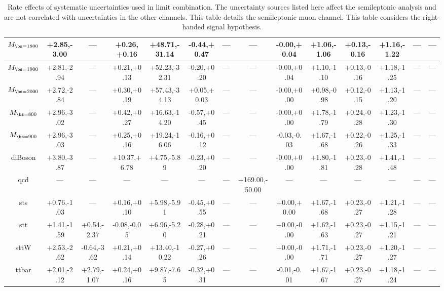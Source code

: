 \begin{table}
\begin{center}
\begin{small}
{\begin{tabular}{|c||ccccccccccccc|}
\hline 
$M_{\bs=1800}$ & +2.85,-3.00 & --- & +0.26,+0.16 & +48.71,-31.14 & -0.44,+0.47 & --- & --- & -0.00,+0.04 & +1.06,-1.06 & +0.13,-0.16 & +1.16,-1.22 & --- & --- \\ 
\hline 
$M_{\bs=1900}$ & +2.81,-2.94 & --- & +0.21,+0.13 & +52.23,-32.31 & -0.20,+0.20 & --- & --- & -0.00,+0.04 & +1.10,-1.10 & +0.13,-0.16 & +1.18,-1.25 & --- & --- \\ 
\hline 
$M_{\bs=2000}$ & +2.72,-2.84 & --- & +0.30,+0.19 & +57.43,-34.13 & +0.05,+0.03 & --- & --- & -0.00,+0.00 & +0.98,-0.98 & +0.12,-0.15 & +1.13,-1.20 & --- & --- \\ 
\hline 
$M_{\bs=800}$ & +2.96,-3.02 & --- & +0.42,+0.27 & +16.63,-14.20 & -0.57,+0.45 & --- & --- & -0.00,+0.00 & +1.78,-1.79 & +0.24,-0.28 & +1.23,-1.30 & --- & --- \\ 
\hline 
$M_{\bs=900}$ & +2.96,-3.03 & --- & +0.25,+0.16 & +19.24,-16.06 & -0.16,+0.12 & --- & --- & -0.03,-0.03 & +1.67,-1.68 & +0.22,-0.26 & +1.25,-1.33 & --- & --- \\ 
\hline 
diBoson & +3.80,-3.87 & --- & +10.37,+6.78 & +4.75,-5.89 & -0.23,+0.20 & --- & --- & -0.00,+0.00 & +1.80,-1.81 & +0.23,-0.28 & +1.41,-1.48 & --- & --- \\ 
\hline 
qcd & --- & --- & --- & --- & --- & --- & +169.00,-50.00 & --- & --- & --- & --- & --- & --- \\ 
\hline 
sts & +0.76,-1.03 & --- & +0.16,+0.10 & +5.98,-5.91 & -0.45,+0.55 & --- & --- & +0.00,+0.00 & +1.67,-1.68 & +0.23,-0.27 & +1.21,-1.28 & --- & --- \\ 
\hline 
stt & +1.41,-1.59 & +0.54,-2.37 & -0.08,-0.05 & +6.96,-5.20 & -0.28,+0.21 & --- & --- & +0.00,-0.00 & +1.62,-1.63 & +0.23,-0.27 & +1.15,-1.21 & --- & --- \\ 
\hline 
sttW & +2.53,-2.62 & -0.64,-3.62 & +0.21,+0.14 & +13.40,-10.22 & -0.27,+0.26 & --- & --- & +0.00,-0.00 & +1.71,-1.71 & +0.23,-0.27 & +1.20,-1.27 & --- & --- \\ 
\hline 
ttbar & +2.01,-2.12 & +2.79,-1.07 & +0.24,+0.16 & +9.87,-7.65 & -0.32,+0.31 & --- & --- & -0.01,-0.01 & +1.67,-1.67 & +0.23,-0.27 & +1.18,-1.24 & --- & --- \\ 
\hline
\end{tabular}
}
\caption{Rate effects of systematic uncertainties used in limit combination.  The uncertainty sources listed here affect the semileptonic analysis and are not correlated with uncertainties in the other channels.  
This table details the semileptonic muon channel.  This table considers the right-handed signal hypothesis.}
\label{table:bsRsysSl2}

\end{small}
\end{center}
\end{table}

